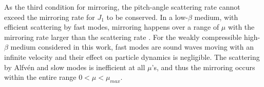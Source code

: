 \documentclass[preprint2,twocolumn,times,tighten]{aastex63}
\begin{document}

As the third condition for mirroring, 
the pitch-angle scattering rate cannot exceed the mirroring rate for $J_1$ to be conserved. 
In a low-$\beta$ medium, with efficient scattering by fast modes, mirroring happens over a range of $\mu$ with the mirroring rate larger than the scattering rate
\citep{CesK73,XL20,LXm21}.
For the weakly compressible high-$\beta$ medium considered in this work, 
fast modes are sound waves moving with an infinite velocity and their effect on particle dynamics is negligible. 
The scattering by Alfv\'{e}n and slow modes is inefficient at all $\mu$'s, 
and thus the mirroring occurs within the entire range 
$0<\mu<\mu_{max}$. 
\end{document}
